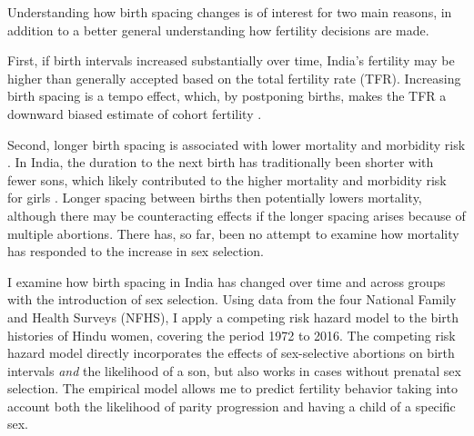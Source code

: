 \documentclass[12pt,letterpaper]{article}
\begin{document}
Understanding how birth spacing changes is of interest for two main reasons, in 
addition to a better general understanding how fertility decisions are made.

First, if birth intervals increased substantially over time, India's fertility may 
be higher than generally accepted based on the total fertility rate (TFR).
Increasing birth spacing is a tempo effect, which, by postponing births, makes the TFR a 
downward biased estimate of cohort fertility 
\citep{Hotz1997,Bongaarts1999,Ni-Bhrolchain2011}.

Second, longer birth spacing is associated with lower mortality and 
morbidity risk \citep{Conde-Agudelo2012,Molitoris2019}.
In India, the duration to the next birth has traditionally been shorter with fewer sons, 
which likely contributed to the higher mortality and morbidity risk for girls
\citep{Whitworth2002,Bhalotra2008,Maitra2008,Jayachandran2011,Jayachandran2017a}.
Longer spacing between births then potentially lowers mortality, although there may
be counteracting effects if the longer spacing arises because of multiple abortions.
There has, so far, been no attempt to examine how mortality has responded to the
increase in sex selection.


I examine how birth spacing in India has changed over time and across 
groups with the introduction of sex selection.
Using data from the four National Family and Health Surveys (NFHS), I apply
a competing risk hazard model to the birth histories of Hindu women, covering
the period 1972 to 2016.
The competing risk hazard model directly incorporates the effects of 
sex-selective abortions on birth intervals
\emph{and} 
the likelihood of a son, 
but also works in cases without prenatal sex selection.
The empirical model allows me to predict fertility behavior taking into
account both the likelihood of parity progression and having a child of a specific sex.
\end{document}
